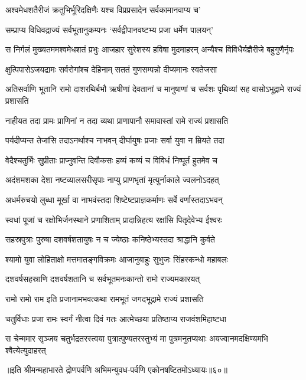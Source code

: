 \twolineshloka
{अश्वमेधशतैरीजं क्रतुभिर्भूरिदक्षिणैः}
{यश्च विप्रप्रसादेन सर्वकामानवाप्य च'}


\twolineshloka
{सम्प्राप्य विधिवद्राज्यं सर्वभूतानुकम्पनः}
{`सर्वद्वीपानवष्टभ्य प्रजा धर्मेण पालयन्'}


\threelineshloka
{स निर्गलं मुख्यतममश्वमेधशतं प्रभुः}
{आजहार सुरेशस्य हविषा मुदमाहरन्}
{अन्यैश्च विविधैर्यज्ञैरीजे बहुगुणैर्नृपः}


\twolineshloka
{क्षुत्पिपासेऽजयद्रामः सर्वरोगांश्च देहिनाम्}
{सततं गुणसम्पन्नो दीप्यमानः स्वतेजसा}


\threelineshloka
{अतिसर्वाणि भूतानि रामो दाशरथिर्बभौ}
{ऋषीणां देवतानां च मानुषाणां च सर्वशः}
{पृथिव्यां सह वासोऽभूद्रामे राज्यं प्रशासति}


\twolineshloka
{नाहीयत तदा प्रामः प्राणिनां न तदा व्यथा}
{प्राणापानौ समावास्तां रामे राज्यं प्रशासति}


\twolineshloka
{पर्यदीप्यन्त तेजांसि तदाऽनर्थाश्च नाभवन्}
{दीर्घायुषः प्रजाः सर्वा युवा न म्रियते तदा}


\twolineshloka
{वेदैश्चतुर्भिः सुप्रीताः प्राप्नुवन्ति दिवौकसः}
{हव्यं कव्यं च विविधं निष्पूर्तं हुतमेव च}


\twolineshloka
{अदंशमशका देशा नष्टव्यालसरीसृपाः}
{नाप्यु प्राणभृतां मृत्युर्नाकाले ज्वलनोऽदहत्}


\twolineshloka
{अधर्मरुचयो लुब्धा मूर्खा वा नाभवंस्तदा}
{शिष्टेष्टप्राज्ञकर्माणः सर्वे वर्णास्तदाऽभवन्}


\twolineshloka
{स्वधां पूजां च रक्षोभिर्जनस्थाने प्रणाशिताम्}
{प्रादान्निहत्य रक्षांसि पितृदेवेभ्य ईश्वरः}


\twolineshloka
{सहस्रपुत्राः पुरुषा दशवर्षशतायुषः}
{न च ज्येष्ठाः कनिष्ठेभ्यस्तदा श्राद्धानि कुर्वते}


\twolineshloka
{श्यामो युवा लोहिताक्षो मत्तमातङ्गविक्रमः}
{आजानुबाहुः सुभुजः सिंहस्कन्धो महाबलः}


\twolineshloka
{दशवर्षसहस्राणि दशवर्षशतानि च}
{सर्वभूतमनःकान्तो रामो राज्यमकारयत्}


\twolineshloka
{रामो रामो राम इति प्रजानामभवत्कथा}
{रामभूतं जगदभूद्रामे राज्यं प्रशासति}


\twolineshloka
{चतुर्विधाः प्रजा रामः स्वर्गं नीत्वा दिवं गतः}
{आत्मेच्छया प्रतिष्ठाप्य राजवंशमिहाष्टधा}


\threelineshloka
{स चेन्ममार सृञ्जय चतुर्भद्रतरस्त्वया}
{पुत्रात्पुण्यतरस्तुभ्यं मा पुत्रमनुतप्यथाः}
{अयज्वानमदक्षिण्यमभि श्वैत्येत्युदाहरत्}


॥इति श्रीमन्महाभारते द्रोणपर्वणि अभिमन्युवध-पर्वणि एकोनषष्टितमोऽध्यायः॥६०॥

\closesection